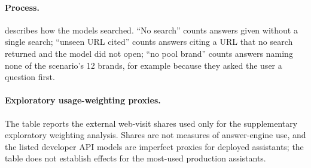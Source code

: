 \paragraph{Process.}  describes how the models searched. ``No search'' counts answers given
without a single search; ``unseen URL cited'' counts answers citing a URL that no search returned and the model did not
open; ``no pool brand'' counts answers naming none of the scenario's 12 brands, for example because they asked the
user a question first.

\begin{table}[htbp]
\centering\small
\caption{How the models searched in the searchable-corpus task: searches and pages opened per episode, and shares of
episodes (\%) answered without a search, citing a URL no search returned, reaching the call limit, or naming none of
the pool's brands (all seven conditions).}
\label{tab:agenticprocess}

\end{table}

\begin{table}[htbp]
\centering\footnotesize
\caption{Searchable-corpus task: effects on mentions with the pages given (main design, same models and trials) and when the
model searches, per model, and effects on whether the target page appeared in search results and was opened
(percentage points; $^{*}$ Holm-adjusted $p < 0.05$).}
\label{tab:agentic}

\end{table}

\paragraph{Exploratory usage-weighting proxies.} The table reports the external web-visit shares used only for the
supplementary exploratory weighting analysis. Shares are not measures of answer-engine use, and the listed developer
API models are imperfect proxies for deployed assistants; the table does not establish effects for the most-used
production assistants.

